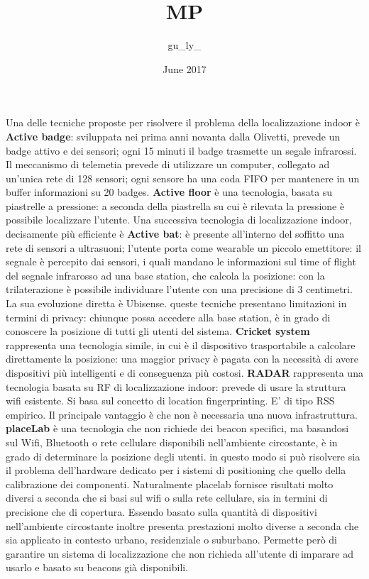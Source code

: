 \documentclass{article}
\title{MP}
\author{gu_ly_ }
\date{June 2017}
\begin{document}
Una delle tecniche proposte per risolvere il problema della localizzazione indoor è \textbf{Active badge}: sviluppata nei prima anni novanta dalla Olivetti, prevede un badge attivo e dei sensori; ogni 15 minuti il badge trasmette un segale infrarossi. Il meccanismo di telemetia prevede di utilizzare un computer, collegato ad un'unica rete di 128 sensori; ogni sensore ha una coda FIFO per mantenere in un buffer informazioni su 20 badges.
\bigbreak
\textbf{Active floor} è una tecnologia, basata su piastrelle a pressione: a seconda della piastrella su cui è rilevata la pressione è possibile localizzare l'utente.
\bigbreak
Una successiva tecnologia di localizzazione indoor, decisamente più efficiente è \textbf{Active bat}: è presente all'interno del soffitto una rete di sensori a ultrasuoni; l'utente porta come wearable un piccolo emettitore: il segnale è percepito dai sensori, i quali mandano le informazioni sul time of flight del segnale infrarosso ad una base station, che calcola la posizione: con la trilaterazione è possibile individuare l'utente con una precisione di 3 centimetri.
La sua evoluzione diretta è Ubisense.
\bigbreak
queste tecniche presentano limitazioni in termini di privacy: chiunque possa accedere alla base station, è in grado di conoscere la posizione di tutti gli utenti del sistema. \textbf{Cricket system} rappresenta una tecnologia simile, in cui è il dispositivo trasportabile a calcolare direttamente la posizione: una maggior privacy è pagata con la necessità di avere dispositivi più intelligenti e di conseguenza più costosi.
\bigbreak
\textbf{RADAR} rappresenta una tecnologia basata su RF di localizzazione indoor: prevede di usare la struttura wifi esistente. Si basa sul concetto di location fingerprinting. E' di tipo RSS empirico. Il principale vantaggio è che non è necessaria una nuova infrastruttura.
\bigbreak
\textbf{placeLab} è una tecnologia che non richiede dei beacon specifici, ma basandosi sul Wifi, Bluetooth o rete cellulare disponibili nell'ambiente circostante, è in grado di determinare la posizione degli utenti. in questo modo si può risolvere sia il problema dell'hardware dedicato per i sistemi di positioning che quello della calibrazione dei componenti.
Naturalmente placelab fornisce risultati molto diversi a seconda che si basi sul wifi o sulla rete cellulare, sia in termini di precisione che di copertura. Essendo basato sulla quantità di dispositivi nell'ambiente circostante inoltre presenta prestazioni molto diverse a seconda che sia applicato in contesto urbano, residenziale o suburbano.
Permette però di garantire un sistema di localizzazione che non richieda all'utente di imparare ad usarlo e basato su beacons già disponibili.
\end{document}
